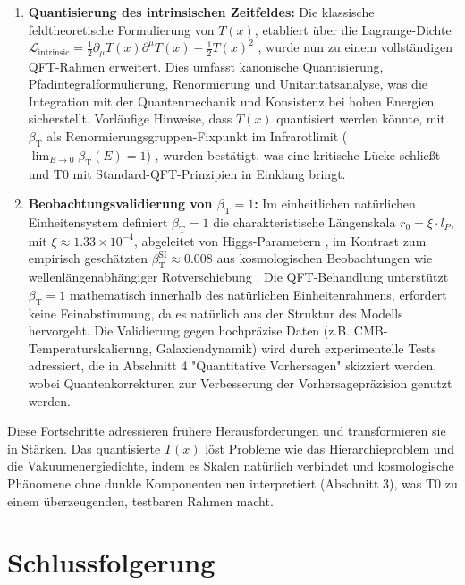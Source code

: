 \documentclass[12pt,a4paper]{article}
\newcommand{\Tfield}{T(x)}
\newcommand{\betaT}{\beta_{\text{T}}}
\newcommand{\calL}{\mathcal{L}}
\begin{document}
	\begin{enumerate}
		\item \textbf{Quantisierung des intrinsischen Zeitfeldes:} Die klassische feldtheoretische Formulierung von \(\Tfield\), etabliert über die Lagrange-Dichte \(\calL_{\text{intrinsic}} = \frac{1}{2}\partial_{\mu}\Tfield\partial^{\mu}\Tfield - \frac{1}{2}\Tfield^2\) \cite{pascher_lagrange_2025}, wurde nun zu einem vollständigen QFT-Rahmen erweitert. Dies umfasst kanonische Quantisierung, Pfadintegralformulierung, Renormierung und Unitaritätsanalyse, was die Integration mit der Quantenmechanik und Konsistenz bei hohen Energien sicherstellt. Vorläufige Hinweise, dass \(\Tfield\) quantisiert werden könnte, mit \(\betaT\) als Renormierungsgruppen-Fixpunkt im Infrarotlimit (\(\lim_{E \to 0} \betaT(E) = 1\)) \cite{pascher_alphabeta_2025}, wurden bestätigt, was eine kritische Lücke schließt und T0 mit Standard-QFT-Prinzipien in Einklang bringt.
		
		\item \textbf{Beobachtungsvalidierung von \(\betaT = 1\):} Im einheitlichen natürlichen Einheitensystem definiert \(\betaT = 1\) die charakteristische Längenskala \(r_0 = \xi \cdot l_P\), mit \(\xi \approx 1.33 \times 10^{-4}\), abgeleitet von Higgs-Parametern \cite{pascher_params_2025, pascher_alphabeta_2025}, im Kontrast zum empirisch geschätzten \(\betaT^{\text{SI}} \approx 0.008\) aus kosmologischen Beobachtungen wie wellenlängenabhängiger Rotverschiebung \cite{pascher_messdifferenzen_2025}. Die QFT-Behandlung unterstützt \(\betaT = 1\) mathematisch innerhalb des natürlichen Einheitenrahmens, erfordert keine Feinabstimmung, da es natürlich aus der Struktur des Modells hervorgeht. Die Validierung gegen hochpräzise Daten (z.B. CMB-Temperaturskalierung, Galaxiendynamik) wird durch experimentelle Tests adressiert, die in Abschnitt 4 "Quantitative Vorhersagen" skizziert werden, wobei Quantenkorrekturen zur Verbesserung der Vorhersagepräzision genutzt werden.
	\end{enumerate}
	
	Diese Fortschritte adressieren frühere Herausforderungen und transformieren sie in Stärken. Das quantisierte \(\Tfield\) löst Probleme wie das Hierarchieproblem und die Vakuumenergiedichte, indem es Skalen natürlich verbindet und kosmologische Phänomene ohne dunkle Komponenten neu interpretiert (Abschnitt 3), was T0 zu einem überzeugenden, testbaren Rahmen macht.
	
	\section{Schlussfolgerung}
	\label{sec:conclusion}
	
\end{document}
